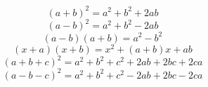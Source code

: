 \documentclass{article}
\begin{document}
    $$(a+b)^2 = a^2 + b^2 + 2ab$$
$$(a-b)^2 = a^2 + b^2 - 2ab$$
$$(a-b)(a+b) = a^2 - b^2$$
$$(x+a)(x+b) = x^2 + (a+b)x + ab$$
$$(a+b+c)^2 = a^2 + b^2 + c^2 + 2ab + 2bc + 2ca$$
$$(a-b-c)^2 = a^2 + b^2 + c^2 - 2ab + 2bc - 2ca$$

    
\end{document}
